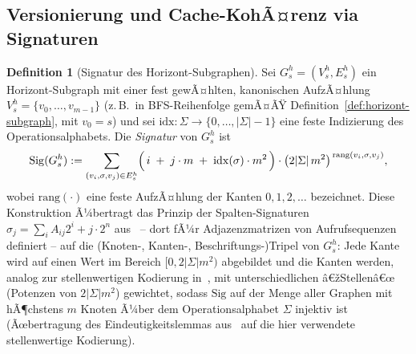 ﻿\documentclass[a4paper,12pt]{article}
\theoremstyle{definition}
\newtheorem{definition}{Definition}
\begin{document}
\subsection{Versionierung und Cache-KohÃ¤renz via Signaturen}
\label{sec:hst-cache}

\begin{definition}[Signatur des Horizont-Subgraphen]
	\label{def:signatur-horizont}
	Sei $G_s^h=(V_s^h,E_s^h)$ ein Horizont-Subgraph mit einer fest gewÃ¤hlten,
	kanonischen AufzÃ¤hlung $V_s^h=\{v_0,\ldots,v_{m-1}\}$ (z.\,B.\ in BFS-Reihenfolge
	gemÃ¤ÃŸ Definition~\ref{def:horizont-subgraph}, mit $v_0=s$) und sei
	$\mathrm{idx}:\Sigma\to\{0,\ldots,|\Sigma|-1\}$ eine feste Indizierung des
	Operationsalphabets. Die \emph{Signatur} von $G_s^h$ ist
	\[
		\mathrm{Sig}(G_s^h) := \sum_{(v_i,\sigma,v_j)\in E_s^h}
		\Bigl(\, i \;+\; j\cdot m \;+\; \mathrm{idx}(\sigma)\cdot m^2 \,\Bigr)\cdot
		\bigl(2|\Sigma|\,m^2\bigr)^{\,\mathrm{rang}(v_i,\sigma,v_j)},
	\]
	wobei $\mathrm{rang}(\cdot)$ eine feste AufzÃ¤hlung der Kanten $0,1,2,\ldots$
	bezeichnet. Diese Konstruktion Ã¼bertragt das Prinzip der Spalten-Signaturen
	$\sigma_j=\sum_iA_{ij}2^i+j\cdot2^n$ aus~\cite{epp2026subgraph} -- dort fÃ¼r
	Adjazenzmatrizen von Aufrufsequenzen definiert -- auf die (Knoten-, Kanten-,
	Beschriftungs-)Tripel von $G_s^h$: Jede Kante wird auf einen Wert im Bereich
	$[0,2|\Sigma|m^2)$ abgebildet und die Kanten werden, analog zur stellenwertigen
	Kodierung in~\cite{epp2026subgraph}, mit unterschiedlichen â€žStellenâ€œ (Potenzen von
	$2|\Sigma|m^2$) gewichtet, sodass $\mathrm{Sig}$ auf der Menge aller Graphen mit
	hÃ¶chstens $m$ Knoten Ã¼ber dem Operationsalphabet $\Sigma$ injektiv ist (Ãœbertragung
	des Eindeutigkeitslemmas aus~\cite{epp2026subgraph} auf die hier verwendete
	stellenwertige Kodierung).
\end{definition}
\end{document}
